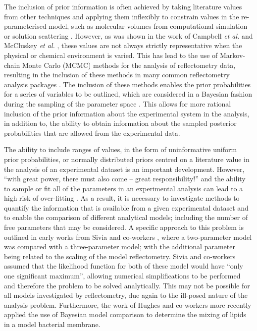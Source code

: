 \documentclass[
 reprint,
 superscriptaddress,
 amsmath,amssymb,
 aps,
]{revtex4-1}
\begin{document}
The inclusion of prior information is often achieved by taking literature values from other techniques and applying them inflexibly to constrain values in the re-parameterised model, such as molecular volumes from computational simulation or solution scattering \cite{sun_order_1994,armen_phospholipid_1998}. 
However, as was shown in the work of Campbell \emph{et al.} \cite{campbell_structure_2018} and McCluskey \emph{et al.} \cite{mccluskey_bayesian_2019}, these values are not always strictly representative when the physical or chemical environment is varied.
This has lead to the use of Markov-chain Monte Carlo (MCMC) methods for the analysis of reflectometry data, resulting in the inclusion of these methods in many common reflectometry analysis packages \cite{hughes_rascal_2017,kienzle_ncnr_2017,nelson_refnx_2019}.
The inclusion of these methods enables the prior probabilities for a series of variables to be outlined, which are considered in a Bayesian fashion during the sampling of the parameter space \cite{bayes_essay_1763,mccluskey_bayesian_2019}. 
This allows for more rational inclusion of the prior information about the experimental system in the analysis, in addition to, the ability to obtain information about the sampled posterior probabilities that are allowed from the experimental data. 

The ability to include ranges of values, in the form of uninformative uniform prior probabilities, or normally distributed priors centred on a literature value in the analysis of an experimental dataset is an important development. 
However, ``with great power, there must also come -- great responsibility!'' \cite{lee_introducting_1962} and the ability to sample or fit all of the parameters in an experimental analysis can lead to a high risk of over-fitting \cite{mayer_drawing_2010}. 
As a result, it is necessary to investigate methods to quantify the information that is available from a given experimental dataset and to enable the comparison of different analytical models; including the number of free parameters that may be considered. 
A specific approach to this problem is outlined in early works from Sivia and co-workers \cite{sivia_analysis_1991,geoghegan_experimental_1996,sivia_bayesian_1998}, where a two-parameter model was compared with a three-parameter model; with the additional parameter being related to the scaling of the model reflectometry. 
Sivia and co-workers assumed that the likelihood function for both of these model would have ``only one significant maximum'', allowing numerical simplifications to be performed and therefore the problem to be solved analytically. 
This may not be possible for all models investigated by reflectometry, due again to the ill-posed nature of the analysis problem. 
Furthermore, the work of Hughes and co-workers \cite{hughes_physical_2019} more recently applied the use of Bayesian model comparison to determine the mixing of lipids in a model bacterial membrane.
\end{document}
